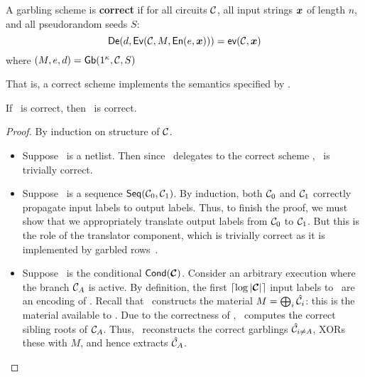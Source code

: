 \begin{definition}[Correctness]\label{def:correct}
  A garbling scheme is \textbf{correct} if for
  all circuits $\mathcal C$,
  all input strings $\cirinp$ of length $n$,
  and all pseudorandom seeds $S$:
  \[
    \gDe(d, \gEv(\cir, \mat,\gEn(e,\cirinp))) = \gev(\cir,\cirinp)
  \]
  where $(M, e, d) = \textsf{Gb}(1^\kappa,\mathcal C,S)$
\end{definition}

That is, a correct scheme implements the semantics specified by \gev.

\begin{theorem}\label{theorem:correctness}
  If \underscheme\ is correct, then \ourscheme\ is correct.
\end{theorem}
\begin{proof}
  By induction on structure of $\mathcal C$.
  \begin{itemize}
    \item Suppose \cir\ is a netlist. Then since \ourscheme\ delegates
      to the correct scheme \underscheme, \ourscheme\ is trivially
      correct.
    \item Suppose \cir\ is a sequence $\textsf{Seq}(\mathcal C_0, \mathcal C_1)$.
      By induction, both $\mathcal C_0$ and $\mathcal C_1$ correctly propagate
      input labels to output labels.
      Thus, to finish the proof, we must show that we appropriately
      translate output labels from $\mathcal C_0$ to $\mathcal C_1$. But this is
      the role of the translator component, which is trivially correct
      as it is implemented by garbled rows~\HK.
    \item Suppose \cir\ is the conditional $\conditional(\vec \cir)$.
      Consider an arbitrary execution where the branch $\mathcal C_{A}$ is
      active.
      By definition, the first $\lceil \log |\vec \cir| \rceil$ input
      labels to \gEv\ are an encoding of \act.
      Recall that \gGb\ constructs the material $M = \bigoplus_i
      \hat{\mathcal C}_i$: this is the material available to \gEv.
      Due to the correctness of \gadget, \gEv\ computes the correct
      sibling roots of $\mathcal C_A$. Thus, \evcond\ reconstructs the correct
      garblings $\hat{\mathcal C}_{i \neq A}$, XORs these with $M$, and hence
      extracts $\hat{\mathcal C}_A$.


\end{itemize}
\end{proof}
